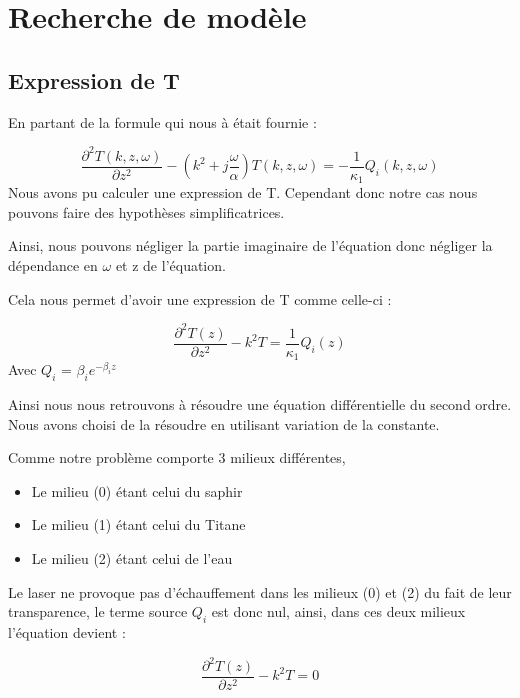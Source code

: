 \documentclass{rapportECC}
\begin{document}
\section{Recherche de modèle}

\subsection{Expression de T}

En partant de la formule qui nous à était fournie :

\begin{equation}
    \frac{\partial^2 T(k,z,\omega)}{\partial z^2} - (k^2 + j\frac{\omega}{\alpha}) T(k,z,\omega) = - \frac{1}{\kappa_1} Q_i(k,z,\omega)
\end{equation}
Nous avons pu calculer une expression de T. Cependant donc notre cas nous pouvons faire des hypothèses simplificatrices.

Ainsi, nous pouvons négliger la partie imaginaire de l'équation donc négliger la dépendance en $\omega$ et z de l'équation.

Cela nous permet d'avoir une expression de T comme celle-ci :

\begin{equation}
    \frac{\partial^2 T(z)}{\partial z^2} - k^2 T = \frac{1}{\kappa_1}Q_i(z)
\end{equation}
Avec $Q_i$ = $\beta_i e^{-\beta_i z}$


Ainsi nous nous retrouvons à résoudre une équation différentielle du second ordre.\\
Nous avons choisi de la résoudre en utilisant variation de la constante.

Comme notre problème comporte 3 milieux différentes,
\begin{itemize}
    \item Le milieu (0) étant celui du saphir
    \item Le milieu (1) étant celui du Titane
    \item Le milieu (2) étant celui de l'eau
\end{itemize}

Le laser ne provoque pas d'échauffement dans les milieux (0) et (2) du fait de leur transparence, le terme source $Q_i$ est donc nul, ainsi, dans ces deux milieux l'équation devient :

\begin{equation}
    \frac{\partial^2 T(z)}{\partial z^2} - k^2 T = 0
\end{equation}
\end{document}
